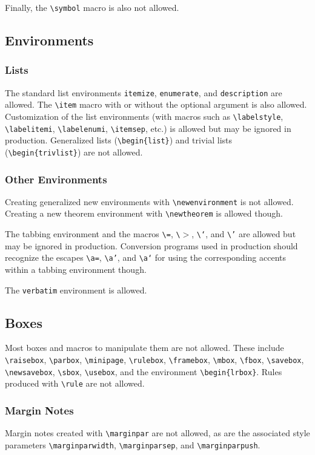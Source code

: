 \documentclass[twocolumn,secnumarabic,amssymb, nobibnotes, aps, prd]{revtex4-1}
\newcommand{\macro}[1]{\texttt{\textbackslash#1}}
\newcommand{\m}[1]{\macro{#1}}
\newcommand{\env}[1]{\texttt{#1}}
\begin{document}
Finally, the \m{symbol} macro is also not allowed.

\subsection{Environments}
\subsubsection{Lists}
The standard list environments \texttt{itemize}, \texttt{enumerate},
and \texttt{description} are allowed. The \m{item} macro with or without
the optional argument is also allowed. Customization of the list environments
(with macros such as \m{labelstyle}, \m{labelitemi}, \m{labelenumi},
\m{itemsep}, etc.) is allowed but may be ignored in production.
Generalized lists (\m{begin\{list\}}) and trivial lists
(\m{begin\{trivlist\}}) are not allowed.

\subsubsection{Other Environments}
Creating generalized new environments with \m{newenvironment} is not
allowed. Creating a new theorem environment with \m{newtheorem} is
allowed though.

The tabbing environment and the macros \m{=}, \m{$>$}, \m{`}, and
\m{'} are allowed but may be ignored in production. Conversion
programs used in production should recognize the escapes \m{a=},
\m{a'}, and \m{a`} for using the corresponding accents within a
tabbing environment though.

The \env{verbatim} environment is allowed.

\subsection{Boxes}
Most boxes and macros to manipulate them are not allowed. These
include \m{raisebox}, \m{parbox}, \m{minipage}, \m{rulebox},
\m{framebox}, \m{mbox}, \m{fbox}, \m{savebox}, \m{newsavebox},
\m{sbox}, \m{usebox}, and the environment \m{begin\{lrbox\}}. Rules
produced with \m{rule} are not allowed.

\subsubsection{Margin Notes}
Margin notes created with \m{marginpar} are not allowed, as are the
associated style parameters \m{marginparwidth}, \m{marginparsep}, and
\m{marginparpush}.
\end{document}
